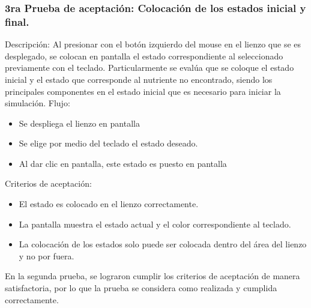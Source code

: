     \subsubsection{3ra Prueba de aceptaci\'on: Colocaci\'on de los estados inicial y final.}
    Descripci\'on: Al presionar con el bot\'on izquierdo del mouse
        en el lienzo que se es desplegado, se colocan en pantalla el
        estado correspondiente al seleccionado previamente con el
        teclado. Particularmente se eval\'ua que se coloque el estado
        inicial y el estado que corresponde al nutriente no
        encontrado, siendo los principales componentes en el estado
        inicial que es necesario para iniciar la simulaci\'on.
    \vskip 0.5cm
    Flujo:
    \vskip 0.5cm
    \begin{itemize}
        \item Se despliega el lienzo en pantalla
        \item Se elige por medio del teclado el estado deseado.
        \item Al dar clic en pantalla, este estado es puesto en pantalla
    \end{itemize}
    Criterios de aceptaci\'on:
    \begin{itemize}
        \item El estado es colocado en el lienzo correctamente.
        \item La pantalla muestra el estado actual y el color
            correspondiente al teclado.
        \item La colocaci\'on de los estados solo puede ser colocada
            dentro del \'area del lienzo y no por fuera.
    \end{itemize}
    \vskip 0.5cm
    En la segunda prueba, se lograron cumplir los criterios de
        aceptaci\'on de manera satisfactoria, por lo que la prueba se
        considera como realizada y cumplida correctamente.
